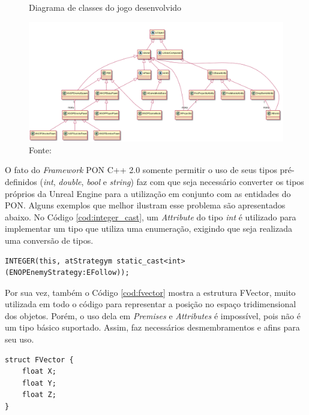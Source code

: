 \begin{figure}[!htb]
  \centering
  \caption{Diagrama de classes do jogo desenvolvido}
  \includegraphics[width=\textwidth]{../out/diagrams/class_diagram_nop/NOPUnreal.png}
  \smallskip
  \caption*{Fonte: }
  \label{fig:class_jogo_fw2}
\end{figure}

O fato do \textit{Framework} PON C++ 2.0 somente permitir o uso de seus tipos
pré-definidos (\textit{int}, \textit{double}, \textit{bool} e \textit{string})
faz com que seja necessário converter os tipos próprios da Unreal Engine para a
utilização em conjunto com as entidades do PON. Alguns exemplos que melhor
ilustram esse problema são apresentados abaixo. No Código
\ref{cod:integer_cast}, um \textit{Attribute} do tipo \textit{int} é utilizado
para implementar um tipo que utiliza uma enumeração, exigindo que seja realizada
uma conversão de tipos.

\begin{lstlisting}[caption = {Uso de \textit{static\_cast} para converter enumerações}, float=htb,
source = {Autoria própria},
label = {cod:integer_cast}]
INTEGER(this, atStrategym static_cast<int>(ENOPEnemyStrategy:EFollow));
\end{lstlisting}

Por sua vez, também o Código \ref{cod:fvector} mostra a estrutura FVector, muito
utilizada em todo o código para representar a posição no espaço tridimensional
dos objetos. Porém, o uso dela em \textit{Premises} e \textit{Attributes} é
impossível, pois não é um tipo básico suportado. Assim, faz necessários
desmembramentos e afins para seu uso. 

\begin{lstlisting}[caption = {Estrutura \textit{FVector} da Unreal Engine}, float=htb,
source = {Autoria própria},
label = {cod:fvector}]
struct FVector {
    float X;
    float Y;
    float Z;
}
\end{lstlisting}

